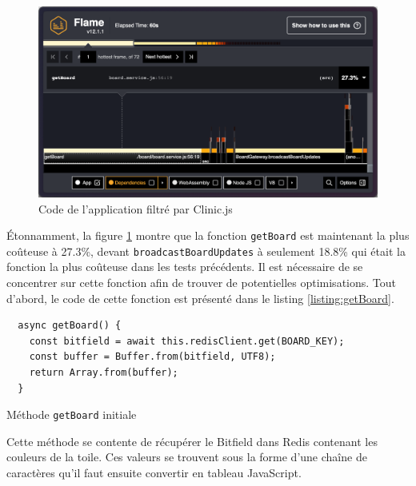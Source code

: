 
\begin{figure}[H]
  \centering
  \includegraphics[width=1\textwidth]{./assets/figures/flame/flame3-filtered.png}
  \caption{Code de l'application filtré par Clinic.js}
  \label{fig:flame3-filtered}
\end{figure}

Étonnamment, la figure \ref{fig:flame3-filtered} montre que la fonction \texttt{getBoard} est maintenant la plus coûteuse à 27.3\%, devant \texttt{broadcastBoardUpdates} à seulement 18.8\%  qui était la fonction la plus coûteuse dans les tests précédents. Il est nécessaire de se concentrer sur cette fonction afin de trouver de potentielles optimisations. Tout d'abord, le code de cette fonction est présenté dans le listing \ref{listing:getBoard}.

\begin{listing}[H]
  \begin{verbatim}
  async getBoard() {
    const bitfield = await this.redisClient.get(BOARD_KEY);
    const buffer = Buffer.from(bitfield, UTF8);
    return Array.from(buffer);
  }
\end{verbatim}
  \caption{Méthode \texttt{getBoard} initiale}
  \label{listing:getBoard}
\end{listing}

Cette méthode se contente de récupérer le Bitfield dans Redis contenant les couleurs de la toile. Ces valeurs se trouvent sous la forme d'une chaîne de caractères qu'il faut ensuite convertir en tableau JavaScript.

